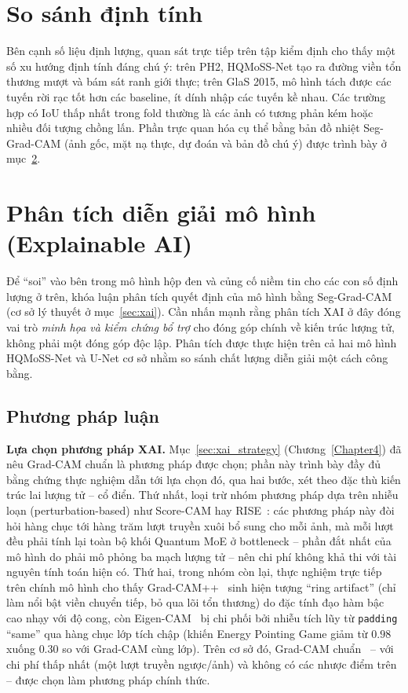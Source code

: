 \FloatBarrier

\section{So sánh định tính}
Bên cạnh số liệu định lượng, quan sát trực tiếp trên tập kiểm định cho thấy một số xu hướng định tính đáng chú ý: trên PH2, HQMoSS-Net tạo ra đường viền tổn thương mượt và bám sát ranh giới thực; trên GlaS 2015, mô hình tách được các tuyến rời rạc tốt hơn các baseline, ít dính nhập các tuyến kề nhau. Các trường hợp có IoU thấp nhất trong fold thường là các ảnh có tương phản kém hoặc nhiều đối tượng chồng lấn. Phần trực quan hóa cụ thể bằng bản đồ nhiệt Seg-Grad-CAM (ảnh gốc, mặt nạ thực, dự đoán và bản đồ chú ý) được trình bày ở mục~\ref{sec:xai_exp}.

\section{Phân tích diễn giải mô hình (Explainable AI)}
\label{sec:xai_exp}
Để ``soi'' vào bên trong mô hình hộp đen và củng cố niềm tin cho các con số định lượng ở trên, khóa luận phân tích quyết định của mô hình bằng Seg-Grad-CAM (cơ sở lý thuyết ở mục~\ref{sec:xai}). Cần nhấn mạnh rằng phân tích XAI ở đây đóng vai trò \emph{minh họa và kiểm chứng bổ trợ} cho đóng góp chính về kiến trúc lượng tử, không phải một đóng góp độc lập. Phân tích được thực hiện trên cả hai mô hình HQMoSS-Net và U-Net cơ sở nhằm so sánh chất lượng diễn giải một cách công bằng.

\subsection{Phương pháp luận}
\label{subsec:xai_method}

\textbf{Lựa chọn phương pháp XAI.} Mục~\ref{sec:xai_strategy} (Chương~\ref{Chapter4}) đã nêu Grad-CAM chuẩn là phương pháp được chọn; phần này trình bày đầy đủ bằng chứng thực nghiệm dẫn tới lựa chọn đó, qua hai bước, xét theo đặc thù kiến trúc lai lượng tử -- cổ điển. Thứ nhất, loại trừ nhóm phương pháp dựa trên nhiễu loạn (perturbation-based) như Score-CAM hay RISE~\cite{petsiuk2018rise}: các phương pháp này đòi hỏi hàng chục tới hàng trăm lượt truyền xuôi bổ sung cho mỗi ảnh, mà mỗi lượt đều phải tính lại toàn bộ khối Quantum MoE ở bottleneck -- phần đắt nhất của mô hình do phải mô phỏng ba mạch lượng tử -- nên chi phí không khả thi với tài nguyên tính toán hiện có. Thứ hai, trong nhóm còn lại, thực nghiệm trực tiếp trên chính mô hình cho thấy Grad-CAM++~\cite{chattopadhay2018gradcampp} sinh hiện tượng ``ring artifact'' (chỉ làm nổi bật viền chuyển tiếp, bỏ qua lõi tổn thương) do đặc tính đạo hàm bậc cao nhạy với độ cong, còn Eigen-CAM~\cite{muhammad2020eigencam} bị chi phối bởi nhiễu tích lũy từ \texttt{padding} ``same'' qua hàng chục lớp tích chập (khiến Energy Pointing Game giảm từ $0.98$ xuống $0.30$ so với Grad-CAM cùng lớp). Trên cơ sở đó, Grad-CAM chuẩn~\cite{selvaraju2017gradcam} -- với chi phí thấp nhất (một lượt truyền ngược/ảnh) và không có các nhược điểm trên -- được chọn làm phương pháp chính thức.

